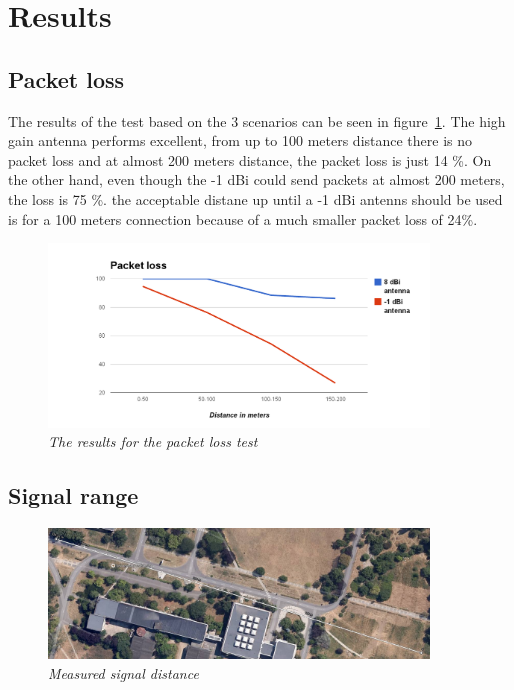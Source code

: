 \section{Results}
 
\subsection{Packet loss}

The results of the test based on the 3 scenarios can be seen in figure~\ref{fig:packet_loss}. The high gain antenna performs excellent, from up to 100 meters distance there is no packet loss and at almost 200 meters distance, the packet loss is just 14 \%. On the other hand, even though the -1 dBi could send packets at almost 200 meters, the loss is 75 \%. the acceptable distane up until a -1 dBi antenns should be used is for a 100 meters connection because of a much smaller packet loss of 24\%. 

\begin{figure}[ht]
\begin{center}
\includegraphics[width=0.9\textwidth]{img/packet_loss.png}
\end{center}
\caption{\small \itshape{The results for the packet loss test}}
  \label{fig:packet_loss}
\end{figure}
 
\subsection{Signal range}

\begin{figure}[ht]
\begin{center}
\includegraphics[width=0.9\textwidth]{img/distance.png}
\end{center}
\caption{\small \itshape{Measured signal distance}}
  \label{fig:distance}
\end{figure}


